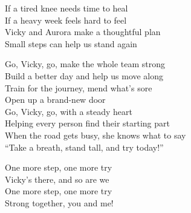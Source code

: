 \begin{lyrics}
If a tired knee needs time to heal\\
If a heavy week feels hard to feel\\
Vicky and Aurora make a thoughtful plan\\
Small steps can help us stand again

Go, Vicky, go, make the whole team strong\\
Build a better day and help us move along\\
Train for the journey, mend what’s sore\\
Open up a brand-new door\\
Go, Vicky, go, with a steady heart\\
Helping every person find their starting part\\
When the road gets busy, she knows what to say\\
“Take a breath, stand tall, and try today!”

One more step, one more try\\
Vicky’s there, and so are we\\
One more step, one more try\\
Strong together, you and me!
\end{lyrics}

